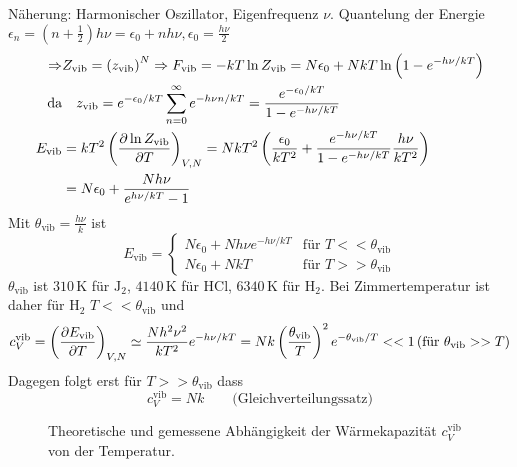 \begin{enumerate}[A)]
    Näherung: Harmonischer Oszillator, Eigenfrequenz $\nu$. Quantelung der Energie
    $\epsilon_n = \left( n + \frac{1}{2} \right) h \nu = \epsilon_0 + n h \nu, \epsilon_0 = \frac{h \nu}{2}$
    \begin{equation}
        \begin{split}
            \Rightarrow & Z_\text{vib} = \left( z_\text{vib} \right)^N \Rightarrow F_\text{vib} = - k T \ln Z_\text{vib} = N \epsilon_0 + N k T \ln \left( 1 - e^{- h \nu / kT} \right)  \\
            \text{da} &\quad  z_\text{vib} = e^{-\epsilon_0/kT} \sum_{n=0}^{\infty} e^{-h\nu n/kT} = \frac{e^{-\epsilon_0 / kT}}{1 - e^{- h \nu / kT}} \\
            E_\text{vib} &= k T^2 \left( \frac{\partial \ln Z_\text{vib}}{\partial T} \right)_{V, N} = N k T^2 \left( \frac{\epsilon_0}{k T^2} + \frac{e^{-h \nu / k T}}{1 - e^{- h \nu / kT}} \frac{h \nu}{k T^2} \right) \\
            &= N \epsilon_0 + \frac{N h \nu}{e^{h \nu / k T} - 1}
        \end{split}
    \end{equation}
    Mit $\theta_\text{vib} = \frac{h \nu}{k}$ ist
    \begin{equation}
        E_\text{vib} =
        \begin{cases}
            N \epsilon_0 + N h \nu e^{- h \nu / kT} & \text{für } T << \theta_\text{vib} \\
            N \epsilon_0 + N k T & \text{für } T >> \theta_\text{vib}
        \end{cases}
    \end{equation}
    $\theta_\text{vib}$ ist $310\,$K für $\text{J}_2$, $4140\,$K für HCl, $6340\,$K für H$_2$. Bei Zimmertemperatur ist daher für H$_2$ $T<<\theta_\text{vib}$ und
    \begin{equation}
        c_V^\text{vib} = \left( \frac{\partial E_\text{vib}}{\partial T} \right)_{V, N} \simeq \frac{N h^2 \nu^2}{k T^2} e^{- h \nu / k T} = N k \left( \frac{\theta_\text{vib}}{T} \right)^2 e^{- \theta_\text{vib} / T} << 1  \left( \text{für } \theta_\text{vib} >> T \right)
    \end{equation}
    Dagegen folgt erst für $T >> \theta_\text{vib}$ dass
    \begin{equation}
        c_V^\text{vib} = N k \qquad \text{(Gleichverteilungssatz)}
    \end{equation}
    
    \begin{figure}[H]
        \centering
        \def\svgwidth{0.5\textwidth}
        
        \caption{Theoretische und gemessene Abhängigkeit der Wärmekapazität $c_V^\text{vib}$
        von der Temperatur.}
        \label{img:CvvibTDiagram}
\end{figure}


\end{enumerate}
